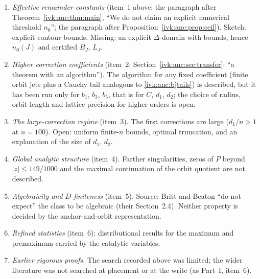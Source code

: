 \documentclass[11pt,letterpaper]{article}
\theoremstyle{remark}\newtheorem{remark}[theorem]{Remark}
\begin{document}
\begin{enumerate}[label=\arabic*.]
\item \emph{Effective remainder constants} (item~1 above; the paragraph after Theorem~\ref{ivk:anc:thm:main}, ``We do not claim an explicit numerical threshold $n_0$''; the paragraph after Proposition~\ref{ivk:anc:prop:ceil}). Sketch: explicit contour bounds. Missing: an explicit $\Delta$-domain with bounds, hence $n_0(J)$ and certified $B_J$, $L_J$.
\item \emph{Higher correction coefficients} (item~2; Section~\ref{ivk:anc:sec:transfer}: ``a theorem with an algorithm''). The algorithm for any fixed coefficient (finite orbit jets plus a Cauchy tail analogous to \eqref{ivk:anc:bjtails}) is described, but it has been run only for $b_1$, $b_3$, $b_5$, that is for $C$, $d_1$, $d_2$; the choice of radius, orbit length and lattice precision for higher orders is open.
\item \emph{The large-correction regime} (item~3). The first corrections are large ($d_1/n>1$ at $n=100$). Open: uniform finite-$n$ bounds, optimal truncation, and an explanation of the size of $d_1$, $d_2$.
\item \emph{Global analytic structure} (item~4). Farther singularities, zeros of $P$ beyond $|z|\le149/1000$ and the maximal continuation of the orbit quotient are not described.
\item \emph{Algebraicity and $D$-finiteness} (item~5). Source: Britt and Beaton ``do not expect'' the class to be algebraic (their Section~2.4). Neither property is decided by the anchor-and-orbit representation.
\item \emph{Refined statistics} (item~6): distributional results for the maximum and premaximum carried by the catalytic variables.
\item \emph{Earlier rigorous proofs.} The search recorded above was limited; the wider literature was not searched at placement or at the write (as Part~I, item~6).
\end{enumerate}
\end{document}
